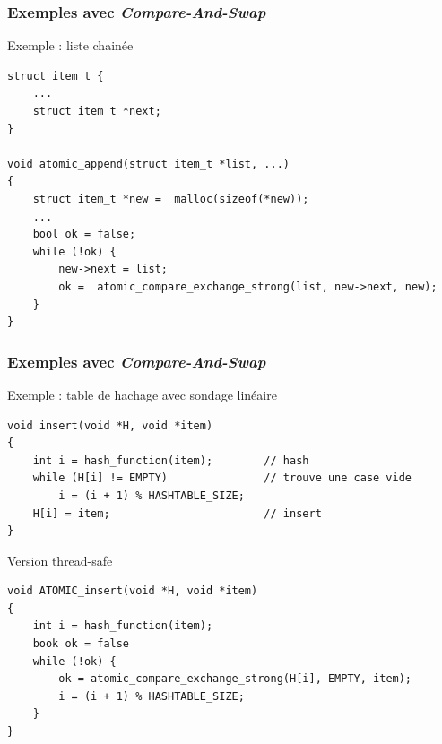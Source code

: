 \documentclass[xcolor={x11names,svgnames}]{beamer}
\begin{document}
\begin{frame}[fragile, label=CAS_list]
  \frametitle{Exemples avec \emph{Compare-And-Swap}}

  \begin{exampleblock}{Exemple : liste chainée}
\begin{verbatim}
struct item_t {
    ...
    struct item_t *next;
}

void atomic_append(struct item_t *list, ...)
{
    struct item_t *new =  malloc(sizeof(*new));
    ...
    bool ok = false;
    while (!ok) {
        new->next = list;
        ok =  atomic_compare_exchange_strong(list, new->next, new);
    }
}
\end{verbatim}
    \end{exampleblock}
\end{frame}


\begin{frame}[fragile, label=CAS_hash]
  \frametitle{Exemples avec \emph{Compare-And-Swap}}

  \begin{exampleblock}{Exemple : table de hachage avec sondage linéaire}
\begin{verbatim}
void insert(void *H, void *item)
{
    int i = hash_function(item);        // hash
    while (H[i] != EMPTY)               // trouve une case vide
        i = (i + 1) % HASHTABLE_SIZE;        
    H[i] = item;                        // insert
}
\end{verbatim}
  \end{exampleblock}

\medskip
  
  \begin{alertblock}{Version thread-safe}
\begin{verbatim}
void ATOMIC_insert(void *H, void *item)
{
    int i = hash_function(item);
    book ok = false
    while (!ok) {
        ok = atomic_compare_exchange_strong(H[i], EMPTY, item);
        i = (i + 1) % HASHTABLE_SIZE;        
    }
}
\end{verbatim}
  \end{alertblock}
\end{frame}

\end{document}
